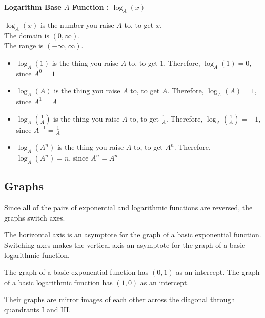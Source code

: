 \documentclass{ximera}
\begin{document}
\begin{definition} \textbf{\textcolor{green!50!black}{Logarithm Base $A$ Function : $\log_A(x)$}}


$\log_A(x)$ is the number you raise $A$ to, to get $x$. \\

The domain is $(0, \infty)$. \\

The range is $(-\infty, \infty)$.


\end{definition}




\begin{conclusion}

\begin{itemize}
\item $\log_A(1)$ is the thing you raise $A$ to, to get $1$. Therefore, $\log_A(1) = 0$, since $A^0 = 1$
\item $\log_A(A)$ is the thing you raise $A$ to, to get $A$. Therefore, $\log_A(A) = 1$, since $A^1 = A$
\item $\log_A(\tfrac{1}{A})$ is the thing you raise $A$ to, to get $\tfrac{1}{A}$. Therefore, $\log_A(\tfrac{1}{A}) = -1$, since $A^{-1} = \tfrac{1}{A}$
\item $\log_A(A^n)$ is the thing you raise $A$ to, to get $A^n$. Therefore, $\log_A(A^n) = n$, since $A^n = A^n$
\end{itemize}

\end{conclusion}





\subsection{Graphs}

Since all of the pairs of exponential and logarithmic functions are reversed, the graphs switch axes.



The horizontal axis is an asymptote for the graph of a basic exponential function. Switching axes makes the vertical axis an asymptote for the graph of a basic logarithmic function.


The graph of a basic exponential function has $(0,1)$ as an intercept.  The graph of a basic logarithmic function has $(1,0)$ as an intercept. 


Their graphs are mirror images of each other across the diagonal through quandrants I and III.
\end{document}
